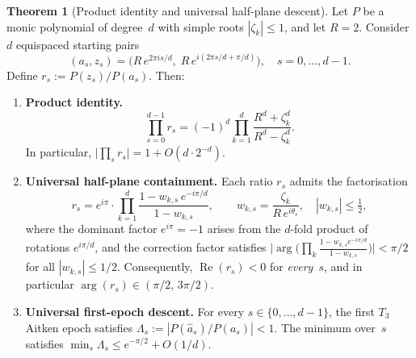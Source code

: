\documentclass[11pt,a4paper]{article}
\theoremstyle{definition}
\newtheorem{theorem}{Theorem}[section]
\begin{document}
\begin{theorem}[Product identity and universal half-plane descent]
\label{thm:winding}
Let $P$ be a monic polynomial of degree~$d$ with simple roots $|\zeta_k| \leq 1$, and let $R = 2$.  Consider $d$ equispaced starting pairs
\[
  (a_s, z_s) = \bigl(R\,e^{2\pi i s/d},\; R\,e^{i(2\pi s/d + \pi/d)}\bigr), \quad s = 0,\ldots,d-1.
\]
Define $r_s := P(z_s)/P(a_s)$.  Then:
\begin{enumerate}
\item[\textup{(i)}] \textbf{Product identity.}
\[
  \prod_{s=0}^{d-1} r_s = (-1)^d \prod_{k=1}^d \frac{R^d + \zeta_k^d}{R^d - \zeta_k^d}.
\]
In particular, $\bigl|\prod_s r_s\bigr| = 1 + O(d\cdot 2^{-d})$.
\item[\textup{(ii)}] \textbf{Universal half-plane containment.}  Each ratio $r_s$ admits the factorisation
\[
  r_s = e^{i\pi} \cdot \prod_{k=1}^d \frac{1 - w_{k,s}\,e^{-i\pi/d}}{1 - w_{k,s}}, \qquad w_{k,s} = \frac{\zeta_k}{R\,e^{i\theta_s}},\quad |w_{k,s}| \leq \tfrac{1}{2},
\]
where the dominant factor $e^{i\pi} = -1$ arises from the $d$-fold product of rotations $e^{i\pi/d}$, and the correction factor satisfies $\bigl|\arg\bigl(\prod_k \tfrac{1-w_{k,s}e^{-i\pi/d}}{1-w_{k,s}}\bigr)\bigr| < \pi/2$ for all $|w_{k,s}| \leq 1/2$. Consequently, $\operatorname{Re}(r_s) < 0$ for \emph{every}~$s$, and in particular $\arg(r_s) \in (\pi/2,\, 3\pi/2)$.

\item[\textup{(iii)}] \textbf{Universal first-epoch descent.}  For every $s \in \{0,\ldots,d-1\}$, the first $T_3$ Aitken epoch satisfies $\Lambda_s := |P(\hat{a}_s)/P(a_s)| < 1$.  The minimum over~$s$ satisfies $\min_s \Lambda_s \leq e^{-\pi/2} + O(1/d)$.
\end{enumerate}
\end{theorem}
\end{document}
